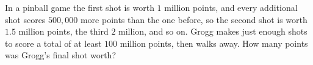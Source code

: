 In a pinball game the first shot is worth $1$ million points, and every additional shot scores $500{,}000$ more points than the one before, so the second shot is worth $1.5$ million points, the third $2$ million, and so on. Grogg makes just enough shots to score a total of at least $100$ million points, then walks away. How many points was Grogg's final shot worth?
